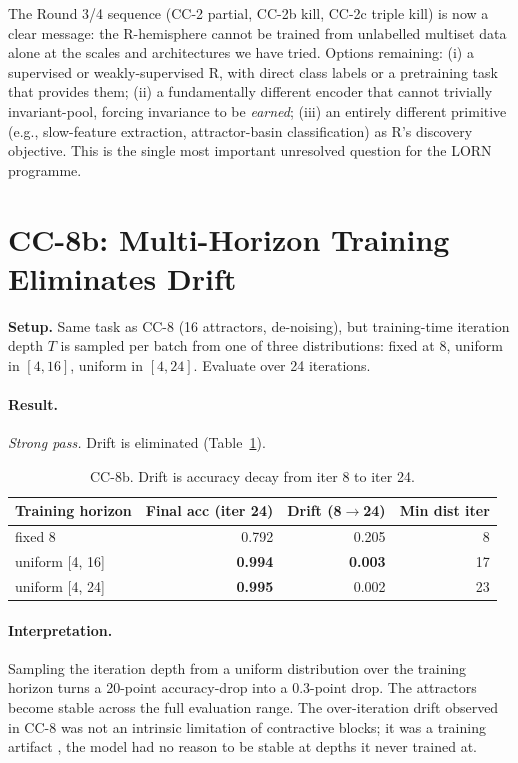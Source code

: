 \documentclass[10pt, twocolumn, a4paper]{article}
\begin{document}
The Round 3/4 sequence (CC-2 partial, CC-2b kill, CC-2c triple kill) is now a clear message: the R-hemisphere cannot be trained from unlabelled multiset data alone at the scales and architectures we have tried. Options remaining: (i) a supervised or weakly-supervised R, with direct class labels or a pretraining task that provides them; (ii) a fundamentally different encoder that cannot trivially invariant-pool, forcing invariance to be \emph{earned}; (iii) an entirely different primitive (e.g., slow-feature extraction, attractor-basin classification) as R's discovery objective. This is the single most important unresolved question for the LORN programme.

\section{CC-8b: Multi-Horizon Training Eliminates Drift}

\textbf{Setup.} Same task as CC-8 (16 attractors, de-noising), but training-time iteration depth $T$ is sampled per batch from one of three distributions: fixed at 8, uniform in $[4, 16]$, uniform in $[4, 24]$. Evaluate over 24 iterations.

\paragraph{Result.} \emph{Strong pass.} Drift is eliminated (Table~\ref{tab:cc8b}).

\begin{table}[t]
\centering\small
\caption{CC-8b. Drift is accuracy decay from iter 8 to iter 24.}
\label{tab:cc8b}
\begin{tabular}{lrrr}
\toprule
Training horizon & Final acc (iter 24) & Drift (8$\to$24) & Min dist iter \\
\midrule
fixed 8                & 0.792 & 0.205 & 8 \\
uniform [4, 16]        & \textbf{0.994} & \textbf{0.003} & 17 \\
uniform [4, 24]        & \textbf{0.995} & 0.002 & 23 \\
\bottomrule
\end{tabular}
\end{table}

\paragraph{Interpretation.} Sampling the iteration depth from a uniform distribution over the training horizon turns a 20-point accuracy-drop into a 0.3-point drop. The attractors become stable across the full evaluation range. The over-iteration drift observed in CC-8 was not an intrinsic limitation of contractive blocks; it was a training artifact ,  the model had no reason to be stable at depths it never trained at.
\end{document}
